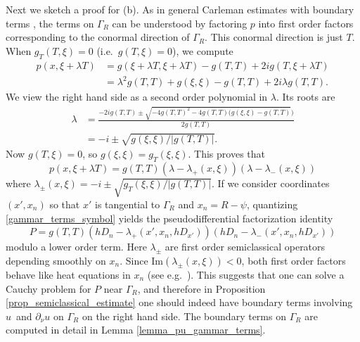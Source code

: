 \documentclass[11pt,letterpaper]{amsart}
\theoremstyle{definition}
\numberwithin{equation}{section}
\newcommand{\p}{\partial}
\def\p{\partial}
\begin{document}
Next we sketch a proof for (b). As in general Carleman estimates with boundary terms \cite{tataru1996, bellassoued2015}, the terms on $\Gamma_R$ can be understood by factoring $p$ into first order factors corresponding to the conormal direction of $\Gamma_R$. This conormal direction is just $T$. When $g_T(T, \xi) = 0$ (i.e.\ $g(T, \xi) = 0$), we compute 
\begin{align*}
p(x, \xi + \lambda T) &= g(\xi + \lambda T, \xi + \lambda T) - g(T, T) + 2i g(T, \xi + \lambda T) \\ 
 &= \lambda^2  g(T, T) + g(\xi, \xi) - g(T, T) + 2i \lambda g(T, T).
\end{align*}
We view the right hand side as a second order polynomial in $\lambda$. Its roots are 
\begin{align*}
\lambda &= \frac{-2i g(T, T) \pm \sqrt{-4 g(T, T)^2  - 4 g(T, T)( g(\xi, \xi)  - g(T, T)} )}{2 g(T, T)} \\
 &= -i \pm \sqrt{g(\xi, \xi)/|g(T, T)|}.
\end{align*}
Now $g(T, \xi) = 0$, so $g(\xi, \xi) = g_T(\xi, \xi)$. This proves that 
\begin{equation} \label{gammar_terms_symbol}
p(x, \xi + \lambda T) = g(T, T) (\lambda - \lambda_{+}(x, \xi)) (\lambda - \lambda_{-}(x,\xi))
\end{equation}
where $\lambda_{\pm}(x, \xi) = -i \pm \sqrt{g_T(\xi, \xi)/|g(T, T)|}$. If we consider coordinates $(x',x_n)$ so that $x'$ is tangential to $\Gamma_R$ and $x_n = R-\psi$, quantizing \eqref{gammar_terms_symbol} yields the pseudodifferential factorization identity 
\[
P = g(T,T) (hD_n - \lambda_+(x',x_n,hD_{x'})) (hD_n - \lambda_-(x',x_n,hD_{x'}))
\]
modulo a lower order term. Here $\lambda_{\pm}$ are first order semiclassical operators depending smoothly on $x_n$. Since $\mathrm{Im}(\lambda_{\pm}(x,\xi)) < 0$, both first order factors behave like heat equations in $x_n$ (see e.g.\ \cite[Chapter III]{treves1980}). This suggests that one can solve a Cauchy problem for $P$ near $\Gamma_R$, and therefore in Proposition \ref{prop_semiclassical_estimate} one should indeed have boundary terms involving $u$ and $\p_{\nu} u$ on $\Gamma_R$ on the right hand side. The boundary terms on $\Gamma_R$ are computed in detail in Lemma \ref{lemma_pu_gammar_terms}.
\end{document}
